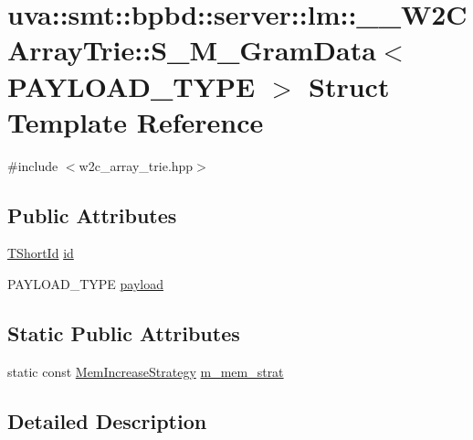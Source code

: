 \hypertarget{structuva_1_1smt_1_1bpbd_1_1server_1_1lm_1_1_____w2_c_array_trie_1_1_s___m___gram_data}{}\section{uva\+:\+:smt\+:\+:bpbd\+:\+:server\+:\+:lm\+:\+:\+\_\+\+\_\+\+W2\+C\+Array\+Trie\+:\+:S\+\_\+\+M\+\_\+\+Gram\+Data$<$ P\+A\+Y\+L\+O\+A\+D\+\_\+\+T\+Y\+P\+E $>$ Struct Template Reference}
\label{structuva_1_1smt_1_1bpbd_1_1server_1_1lm_1_1_____w2_c_array_trie_1_1_s___m___gram_data}


{\ttfamily \#include $<$w2c\+\_\+array\+\_\+trie.\+hpp$>$}

\subsection*{Public Attributes}
\begin{DoxyCompactItemize}
\item 
\hyperlink{namespaceuva_1_1smt_1_1bpbd_1_1server_1_1lm_1_1identifiers_a33043a191e9a637dea742a89d23c8bdc}{T\+Short\+Id} \hyperlink{structuva_1_1smt_1_1bpbd_1_1server_1_1lm_1_1_____w2_c_array_trie_1_1_s___m___gram_data_a0b235c9677bb7fe150c1c0b9d400f2bc}{id}
\item 
P\+A\+Y\+L\+O\+A\+D\+\_\+\+T\+Y\+P\+E \hyperlink{structuva_1_1smt_1_1bpbd_1_1server_1_1lm_1_1_____w2_c_array_trie_1_1_s___m___gram_data_a623cb2bdb3aea0d0d9a88110271fe89b}{payload}
\end{DoxyCompactItemize}
\subsection*{Static Public Attributes}
\begin{DoxyCompactItemize}
\item 
static const \hyperlink{classuva_1_1utils_1_1containers_1_1_mem_increase_strategy}{Mem\+Increase\+Strategy} \hyperlink{structuva_1_1smt_1_1bpbd_1_1server_1_1lm_1_1_____w2_c_array_trie_1_1_s___m___gram_data_a765a646b8bca568bf1012b044d812ff7}{m\+\_\+mem\+\_\+strat}
\end{DoxyCompactItemize}


\subsection{Detailed Description}
